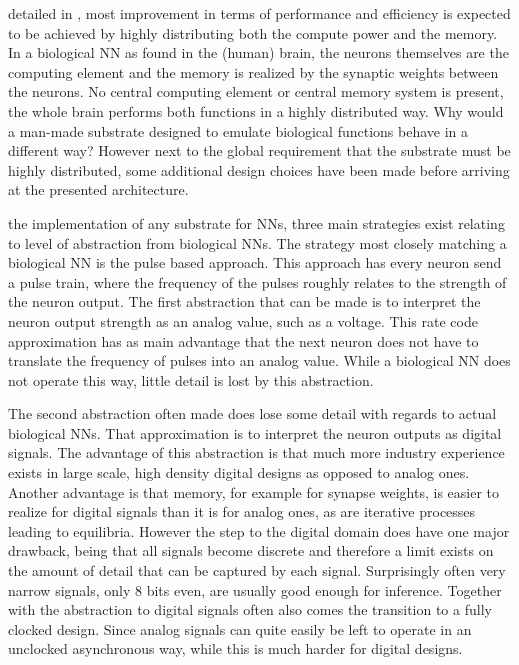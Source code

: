  detailed in , most improvement in terms of performance and efficiency is expected to be achieved by highly distributing both the compute power and the memory. In a biological \ac{NN} as found in the (human) brain, the neurons themselves are the computing element and the memory is realized by the synaptic weights between the neurons.  No central computing element or central memory system is present, the whole brain performs both functions in a highly distributed way. Why would a man-made substrate designed to emulate biological functions behave in a different way? However next to the global requirement that the substrate must be highly distributed, some additional design choices have been made before arriving at the presented architecture.

 the implementation of any substrate for \acp{NN}, three main strategies exist relating to level of abstraction from biological \acp{NN}. The strategy most closely matching a biological \ac{NN} is the pulse based approach. This approach has every neuron send a pulse train, where the frequency of the pulses roughly relates to the strength of the neuron output. The first abstraction that can be made is to interpret the neuron output strength as an analog value, such as a voltage. This rate code approximation has as main advantage that the next neuron does not have to translate the frequency of pulses into an analog value. While a biological \ac{NN} does not operate this way, little detail is lost by this abstraction.

The second abstraction often made does lose some detail with regards to actual biological \acp{NN}. That approximation is to interpret the neuron outputs as digital signals. The advantage of this abstraction is that much more industry experience exists in large scale, high density digital designs as opposed to analog ones. Another advantage is that memory, for example for synapse weights, is easier to realize for digital signals than it is for analog ones, as are iterative processes leading to equilibria. However the step to the digital domain does have one major drawback, being that all signals become discrete and therefore a limit exists on the amount of detail that can be captured by each signal. Surprisingly often very narrow signals, only 8 bits even, are usually good enough for inference\cite{8192463}. Together with the abstraction to digital signals often also comes the transition to a fully clocked design. Since analog signals can quite easily be left to operate in an unclocked asynchronous way, while this is much harder for digital designs.

